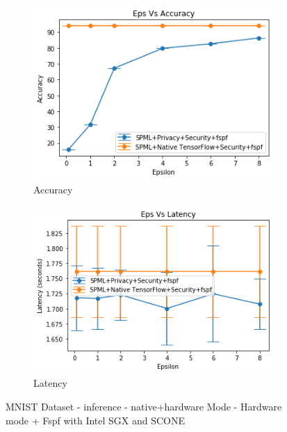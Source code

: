 \begin{figure}
\begin{subfigure}{0.5\textwidth}
         \includegraphics[width=\textwidth]{images/Inference/MnistFLAccuracyInference.png}
         \caption{Accuracy}
         \label{fig:appendixFLMnistAccuracyInference}
     \end{subfigure}
     \begin{subfigure}{0.5\textwidth}
         \includegraphics[width=\textwidth]{images/Inference/MnistFLLatencyInference.png}
         \caption{Latency}
         \label{fig:appendixFLMnistLatencyInference}
     \end{subfigure}
        \caption{MNIST Dataset - inference - native+hardware Mode - Hardware mode + Fspf with Intel SGX and SCONE}
\end{figure}

